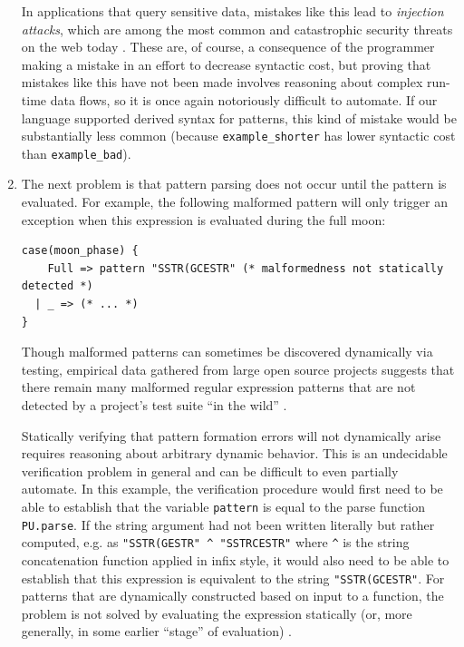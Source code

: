 \begin{enumerate}
In applications that query sensitive data, mistakes like this lead to \emph{injection attacks}, which are among the most common and catastrophic security threats on the web today \cite{owasp2013}. These are, of course, a consequence of the programmer making a mistake in an effort to decrease syntactic cost, but proving that mistakes like this have not been made involves reasoning about complex run-time data flows, so it is once again notoriously difficult to automate. If our language supported derived syntax for patterns, this kind of mistake would be substantially less common (because \lstinline{example_shorter} has lower syntactic cost than \lstinline{example_bad}).

\item The next problem is that pattern parsing does not occur until the pattern is evaluated. For example, the following malformed pattern will only trigger an exception when this expression is evaluated during the full moon: %

\begin{lstlisting}[numbers=none]
case(moon_phase) {
    Full => pattern "SSTR(GCESTR" (* malformedness not statically detected *)
  | _ => (* ... *)
}
\end{lstlisting}
Though malformed patterns can sometimes be discovered dynamically via testing, empirical data gathered from large open source projects suggests that there remain many malformed regular expression patterns that are not detected by a project's test suite ``in the wild'' \cite{spishak2012type}. 

Statically verifying that pattern formation errors will not dynamically arise requires reasoning about arbitrary dynamic behavior. This is an undecidable verification problem in general and can be difficult to even partially automate. In this example, the verification procedure would first need to be able to establish that the variable \lstinline{pattern} is equal to the parse function \lstinline{PU.parse}. If the string argument had not been written literally but rather computed, e.g. as \lstinline{"SSTR(GESTR" ^ "SSTRCESTR"} where \lstinline{^} is the string concatenation function applied in infix style, it would also need to be able to establish that this expression is equivalent to the string \lstinline{"SSTR(GCESTR"}. For patterns that are dynamically constructed based on input to a function, the problem is not solved by   evaluating the expression statically (or, more generally, in some earlier ``stage'' of evaluation) \cite{Jones:Gomard:Sestoft:93:PartialEvaluation}. 


\end{enumerate}
